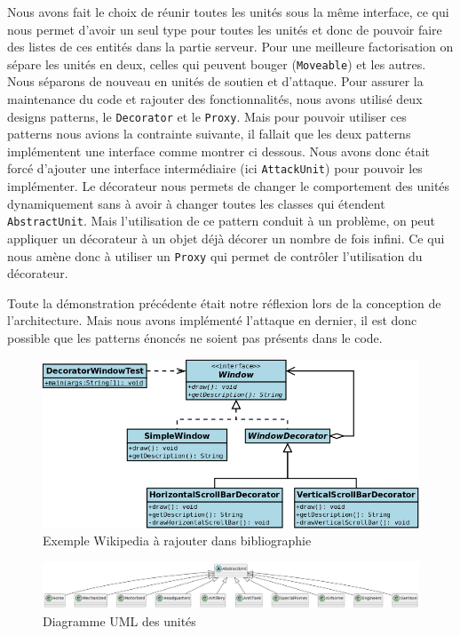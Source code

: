 Nous avons fait le choix de réunir toutes les unités sous la même interface, ce qui nous permet d'avoir un seul type pour toutes les unités et donc de pouvoir faire des listes de ces entités dans la partie serveur.
Pour une meilleure factorisation on sépare les unités en deux, celles qui peuvent bouger (\lstinline{Moveable}) et les autres. Nous séparons de nouveau en unités de soutien et d'attaque. Pour assurer la maintenance du code et rajouter des fonctionnalités, nous avons utilisé deux designs patterns, le \lstinline{Decorator} et le \lstinline{Proxy}. Mais pour pouvoir utiliser ces patterns nous avions la contrainte suivante, il fallait que les deux patterns implémentent une interface comme montrer ci dessous. Nous avons donc était forcé d'ajouter une interface intermédiaire (ici \lstinline{AttackUnit}) pour pouvoir les implémenter. Le décorateur nous permets de changer le comportement des unités dynamiquement sans à avoir à changer toutes les classes qui étendent \lstinline{AbstractUnit}. Mais l'utilisation de ce pattern conduit à un problème, on peut appliquer un décorateur à un objet déjà décorer un nombre de fois infini. Ce qui nous amène donc à utiliser un \lstinline{Proxy} qui permet de contrôler l'utilisation du décorateur. 

Toute la démonstration précédente était notre réflexion lors de la conception de l'architecture. Mais nous avons implémenté l'attaque en dernier, il est donc possible que les patterns énoncés ne soient pas présents dans le code.

\begin{figure}[H]
    \centering
    \includegraphics[scale=0.3]{data/UML_Decorator_Pattern_Exmple.png}
    \caption{Exemple Wikipedia à rajouter dans bibliographie}
\end{figure}

\begin{figure}[H]
    \centering
    \includegraphics[scale=0.3]{data/uml_abstract_unit.png}
    \caption{Diagramme UML des unités}
\end{figure}

